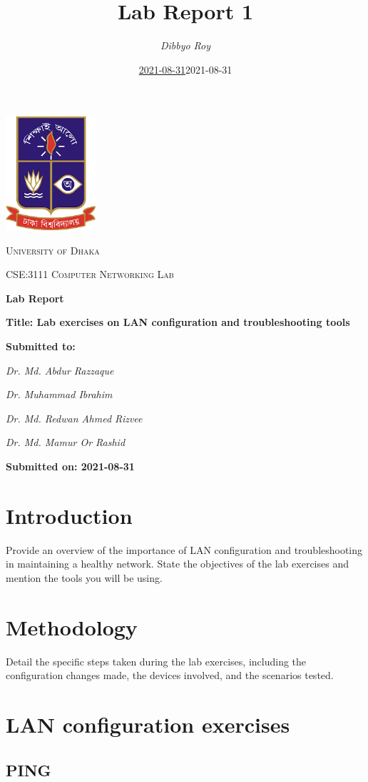 \documentclass[12pt]{article}
\title{\textbf{Lab Report 1}}
\author{\textit{Dibbyo Roy}}
\date{\underline{2021-08-31}}
\date {2021-08-31 }
\begin{document}
\centering
\includegraphics[width=0.25\textwidth]{du.png}\par\vspace{1cm}
{\scshape\LARGE University of Dhaka \par}

\vfill
{\scshape\Large CSE:3111 Computer Networking Lab\par}

\vfill
{\huge\bfseries Lab Report\par}
\vfill
{\Large\textbf {
    Title: Lab exercises on LAN configuration and troubleshooting tools
}\par}

\vfill
{
}

\vfill
{\Large \textbf{ Submitted to:}\par}
{ \textit{Dr. Md. Abdur Razzaque}\par}
{ \textit{Dr. Muhammad Ibrahim}\par}
{ \textit{Dr. Md. Redwan Ahmed Rizvee}\par}
{ \textit{Dr. Md. Mamur Or Rashid}\par}

\vfill
{\Large\textbf {
    Submitted on: 2021-08-31
}\par}


\newpage 
\raggedright
\section*{Introduction}
Provide an overview of the importance of LAN configuration and troubleshooting in maintaining a healthy network. State the objectives of the lab exercises and mention the tools you will be using.
\vspace*{1\baselineskip}
\section*{Methodology}
Detail the specific steps taken during the lab exercises, including the configuration changes made, the devices involved, and the scenarios tested.
\vspace*{1\baselineskip}

\section*{LAN configuration exercises}

\subsection{PING}
\end{document}

